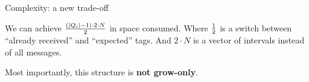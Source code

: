 \documentclass[10pt, xcolor={usenames, dvipsnames}]{beamer}
\begin{document}
%     
%             
    



\begin{frame}{Complexity: a new trade-off}

  \begin{table}
    \begin{center}
      
    \end{center}
  \end{table}

  \vspace{1em}

  \begin{minipage}{0.48\textwidth}
    \begin{center}
      
    \end{center}
  \end{minipage}\hfill
  \begin{minipage}{0.48\textwidth}
    \begin{center}
      
    \end{center}
  \end{minipage}
  
  \vspace{1em}
  
  We can achieve ${(|Q_i| - 1) \cdot 2\cdot N}\over{2}$ in space consumed. Where
  ${1}\over{2}$ is a switch between ``already received'' and ``expected''
  tags. And $2\cdot N$ is a vector of intervals instead of all messages.
  
  \vspace{1em}

  Most importantly, this structure is \textbf{not grow-only}.

\end{frame}
\end{document}

